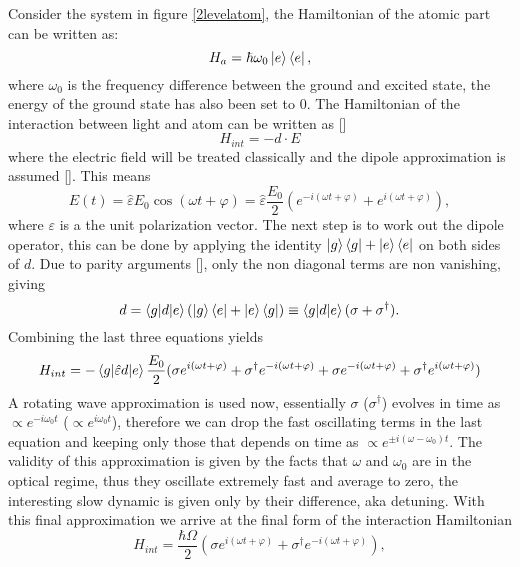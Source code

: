 Consider the system in figure \ref{2levelatom}, the Hamiltonian of the atomic part can be written as:
\begin{equation}
H_a = \hbar\omega_0 \ket{e}\bra{e},
\end{equation}
where $\omega_0$ is the frequency difference between the ground and excited state, the energy of the ground state has also been set to 0. The Hamiltonian of the interaction between light and atom can be written as []
\begin{equation}
H_{int} = -d\cdot E
\end{equation}
where the electric field will be treated classically and the dipole approximation is assumed []. This means
\begin{equation}
E(t) = \hat{\varepsilon} E_0 \cos(\omega t+\varphi) = \hat{\varepsilon} \frac{E_0}{2} \left(e^{-i(\omega t+\varphi)} + e^{i(\omega t+\varphi)}\right),
\end{equation}
where $\varepsilon$ is a the unit polarization vector. The next step is to work out the dipole operator, this can be done by applying the identity $\ket{g}\bra{g} + \ket{e}\bra{e}$ on both sides of $d$. Due to parity arguments [], only the non diagonal terms are non vanishing, giving
\begin{equation}
d = \braket{g|d|e}\left(\ket{g}\bra{e} + \ket{e}\bra{g}\right) \equiv \braket{g|d|e}(\sigma + \sigma^\dagger).
\end{equation}
Combining the last three equations yields
\begin{equation}
H_{int} = - \braket{g|\hat{\varepsilon} d|e}\frac{E_0}{2}(\sigma e^{i(\omega t+\varphi)} + \sigma^\dagger e^{-i(\omega t+\varphi)} + \sigma e^{-i(\omega t+\varphi)} + \sigma^\dagger e^{i(\omega t+\varphi)})
\end{equation}
A rotating wave approximation is used now, essentially $\sigma$ ($\sigma^\dagger$) evolves in time as $\propto e^{-i\omega_0 t}$ ($\propto e^{i\omega_0 t}$), therefore we can drop the fast oscillating terms in the last equation and keeping only those that depends on time as $\propto e^{\pm i(\omega-\omega_0 )t}$. The validity of this approximation is given by the facts that $\omega$ and $\omega_0$ are in the optical regime, thus they oscillate extremely fast and average to zero, the interesting slow dynamic is given only by their difference, aka detuning.
With this final approximation we arrive at the final form of the interaction Hamiltonian
\begin{equation}
H_{int} = \frac{\hbar \Omega}{2}(\sigma e^{i(\omega t+\varphi)} + \sigma^\dagger e^{-i(\omega t+\varphi)}),
\end{equation}
